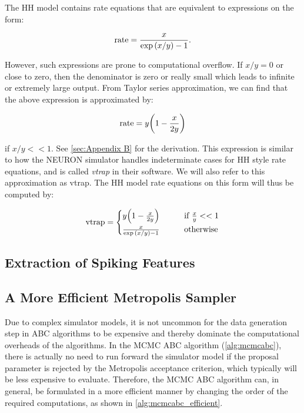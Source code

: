 The HH model contains rate equations that are equivalent to expressions on the form:

\begin{equation*}
    \mathrm{rate} = \frac{x}{\exp \qty(x/y) - 1}.
\end{equation*}

However, such expressions are prone to computational overflow. If $x/y = 0$ or close to zero, then the denominator is zero or really small which leads to infinite or extremely large output. From Taylor series approximation, we can find that the above expression is approximated by:

\begin{equation*}
    \mathrm{rate} = y \qty(1 - \frac{x}{2y})
\end{equation*}

if $x/y << 1$. See \autoref{sec:Appendix B} for the derivation. This expression is similar to how the NEURON simulator \cite{neuron_book} handles indeterminate cases for HH style rate equations, and is called \textit{vtrap} in their software. We will also refer to this approximation as vtrap. The HH model rate equations on this form will thus be computed by:

\begin{equation}\label{eq:vtrap}
    \mathrm{vtrap} = \begin{cases}
    y \qty(1 - \frac{x}{2y}) \qquad &\text{if } \frac{x}{y} << 1
    \\
    \frac{x}{\exp \qty(x/y) - 1} \qquad &\text{otherwise}
    \end{cases}
\end{equation}

\subsection{Extraction of Spiking Features} 



\subsection{A More Efficient Metropolis Sampler}

Due to complex simulator models, it is not uncommon for the data generation step in ABC algorithms to be expensive and thereby dominate the computational overheads of the algorithms. In the MCMC ABC algorithm (\cref{alg:mcmcabc}), there is actually no need to run forward the simulator model if the proposal parameter is rejected by the Metropolis acceptance criterion, which typically will be less expensive to evaluate. Therefore, the MCMC ABC algorithm can, in general, be formulated in a more efficient manner by changing the order of the required computations, as shown in \cref{alg:mcmcabc_efficient}. 

